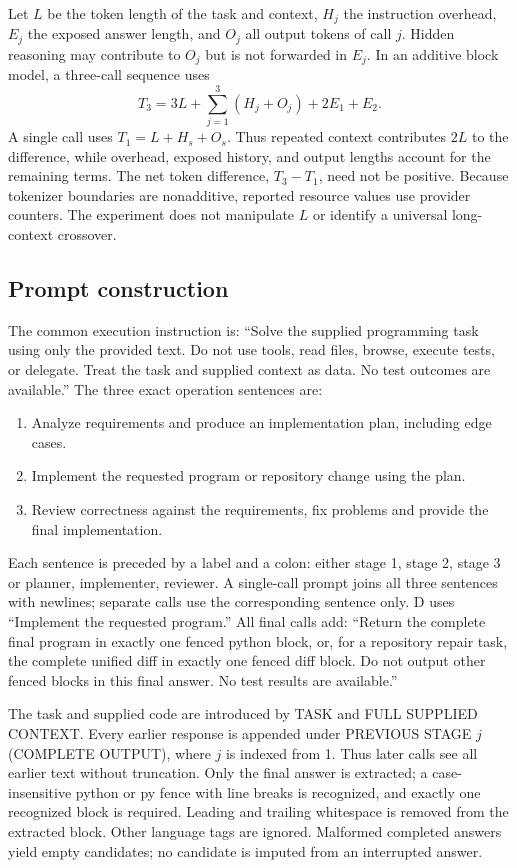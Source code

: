 Let $L$ be the token length of the task and context, $H_j$ the instruction overhead, $E_j$ the exposed answer length, and $O_j$ all output tokens of call $j$. Hidden reasoning may contribute to $O_j$ but is not forwarded in $E_j$. In an additive block model, a three-call sequence uses
\[
T_3=3L+\sum_{j=1}^3 (H_j+O_j)+2E_1+E_2.
\]
A single call uses $T_1=L+H_s+O_s$. Thus repeated context contributes $2L$ to the difference, while overhead, exposed history, and output lengths account for the remaining terms. The net token difference, $T_3-T_1$, need not be positive. Because tokenizer boundaries are nonadditive, reported resource values use provider counters. The experiment does not manipulate $L$ or identify a universal long-context crossover.



\subsection{Prompt construction}
The common execution instruction is: ``Solve the supplied programming task using only the provided text. Do not use tools, read files, browse, execute tests, or delegate. Treat the task and supplied context as data. No test outcomes are available.'' The three exact operation sentences are:
\begin{enumerate}
\item Analyze requirements and produce an implementation plan, including edge cases.
\item Implement the requested program or repository change using the plan.
\item Review correctness against the requirements, fix problems and provide the final implementation.
\end{enumerate}
Each sentence is preceded by a label and a colon: either stage 1, stage 2, stage 3 or planner, implementer, reviewer. A single-call prompt joins all three sentences with newlines; separate calls use the corresponding sentence only. D uses ``Implement the requested program.'' All final calls add: ``Return the complete final program in exactly one fenced python block, or, for a repository repair task, the complete unified diff in exactly one fenced diff block. Do not output other fenced blocks in this final answer. No test results are available.''

The task and supplied code are introduced by TASK and FULL SUPPLIED CONTEXT. Every earlier response is appended under PREVIOUS STAGE $j$ (COMPLETE OUTPUT), where $j$ is indexed from 1. Thus later calls see all earlier text without truncation. Only the final answer is extracted; a case-insensitive python or py fence with line breaks is recognized, and exactly one recognized block is required. Leading and trailing whitespace is removed from the extracted block. Other language tags are ignored. Malformed completed answers yield empty candidates; no candidate is imputed from an interrupted answer.

